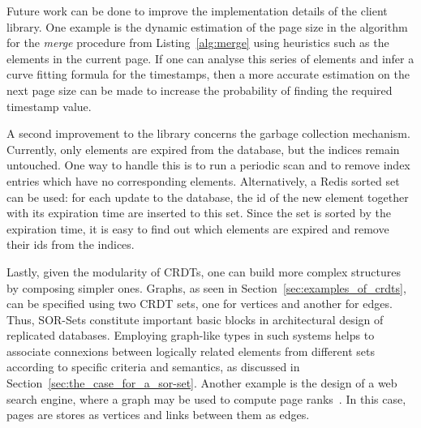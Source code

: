Future work can be done to improve the implementation details of the client
library. One example is the dynamic estimation of the page size in the algorithm
for the \textit{merge} procedure from Listing~\ref{alg:merge} using heuristics
such as the elements in the current page. If one can analyse this series of
elements and infer a curve fitting formula for the timestamps, then a more
accurate estimation on the next page size can be made to increase the
probability of finding the required timestamp value.

A second improvement to the library concerns the garbage collection mechanism.
Currently, only elements are expired from the database, but the indices remain
untouched. One way to handle this is to run a periodic scan and to remove index
entries which have no corresponding elements. Alternatively, a Redis sorted set
can be used: for each update to the database, the id of the new element together
with its expiration time are inserted to this set. Since the set is sorted by
the expiration time, it is easy to find out which elements are expired and
remove their ids from the indices.

Lastly, given the modularity of CRDTs, one can build more complex structures by
composing simpler ones. Graphs, as seen in Section~\ref{sec:examples_of_crdts},
can be specified using two CRDT sets, one for vertices and another for edges.
Thus, SOR-Sets constitute important basic blocks in architectural design of
replicated databases. Employing graph-like types in such systems helps to
associate connexions between logically related elements from different sets
according to specific criteria and semantics, as discussed in
Section~\ref{sec:the_case_for_a_sor-set}. Another example is the design of a web
search engine, where a graph may be used to compute page
ranks~\cite{Shapiro:2011:CRD:2050613.2050642}. In this case, pages are stores as
vertices and links between them as edges.